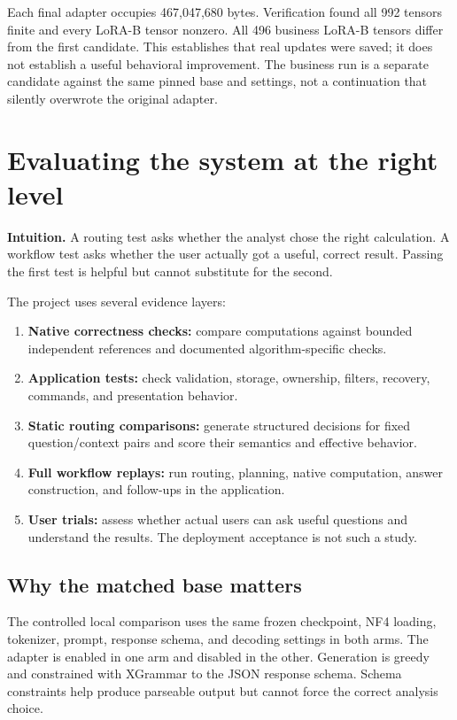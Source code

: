 \documentclass[11pt,a4paper]{article}
\newcommand{\intuition}[1]{\par\textbf{Intuition.} #1\par}
\begin{document}
Each final adapter occupies 467,047,680 bytes. Verification found all 992 tensors
finite and every LoRA-B tensor nonzero. All 496 business LoRA-B tensors differ
from the first candidate. This establishes that real updates were saved; it does
not establish a useful behavioral improvement. The business run is a separate
candidate against the same pinned base and settings, not a continuation that
silently overwrote the original adapter.

\section{Evaluating the system at the right level}
\label{sec:eval}

\intuition{A routing test asks whether the analyst chose the right calculation.
A workflow test asks whether the user actually got a useful, correct result.
Passing the first test is helpful but cannot substitute for the second.}

The project uses several evidence layers:
\begin{enumerate}
\item \textbf{Native correctness checks:} compare computations against bounded
  independent references and documented algorithm-specific checks.
\item \textbf{Application tests:} check validation, storage, ownership, filters,
  recovery, commands, and presentation behavior.
\item \textbf{Static routing comparisons:} generate structured decisions for
  fixed question/context pairs and score their semantics and effective behavior.
\item \textbf{Full workflow replays:} run routing, planning, native computation,
  answer construction, and follow-ups in the application.
\item \textbf{User trials:} assess whether actual users can ask useful questions
  and understand the results. The deployment acceptance is not such a study.
\end{enumerate}

\subsection{Why the matched base matters}

The controlled local comparison uses the same frozen checkpoint, NF4 loading,
tokenizer, prompt, response schema, and decoding settings in both arms. The
adapter is enabled in one arm and disabled in the other. Generation is greedy
and constrained with XGrammar to the JSON response schema. Schema constraints
help produce parseable output but cannot force the correct analysis choice.
\end{document}
